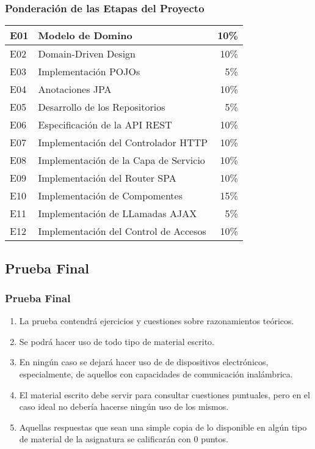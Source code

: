 \documentclass[a4paper,t,xcolor=pst,dvips,colortheme]{beamer}
\begin{document}
\begin{frame}[c]
    \frametitle{Ponderación de las Etapas del Proyecto}
    \begin{center}
	\begin{tabular}{|ll|r|}
    \hline \hline
	E01 & Modelo de Domino     & 10\% \\ \hline
    E02 & Domain-Driven Design & 10\% \\ \hline	
    E03 & Implementación POJOs &  5\% \\ \hline
    E04 & Anotaciones JPA                  & 10\% \\ \hline
    E05 & Desarrollo de los Repositorios   &  5\% \\ \hline
    E06 & Especificación de la API REST    & 10\% \\ \hline
    E07 & Implementación del Controlador HTTP   &   10\% \\ \hline
    E08 & Implementación de la Capa de Servicio &  10\% \\ \hline
    E09 & Implementación del Router SPA         & 10\% \\ \hline
    E10 & Implementación de Compomentes         & 15\% \\ \hline
    E11 & Implementación de LLamadas AJAX       &  5\% \\ \hline
    E12 & Implementación del Control de Accesos & 10\% \\
    \hline \hline
	\end{tabular}
    \end{center}
\end{frame}

\subsection{Prueba Final}

\begin{frame}[c]
    \frametitle{Prueba Final}
	\begin{enumerate}[<+->]
		\item La prueba contendrá ejercicios y cuestiones sobre razonamientos teóricos.
        \item Se podrá hacer uso de todo tipo de material escrito.
        \item En ningún caso se dejará hacer uso de de dispositivos electrónicos, especialmente, de aquellos con capacidades de comunicación inalámbrica.
		\item \alert{El material escrito debe servir para consultar cuestiones puntuales, pero en el caso ideal no debería hacerse ningún uso de los mismos}.
		\item Aquellas respuestas que sean una simple copia de lo disponible en algún tipo de material de la asignatura se calificarán con 0 puntos.
	\end{enumerate}
\end{frame}
\end{document}

